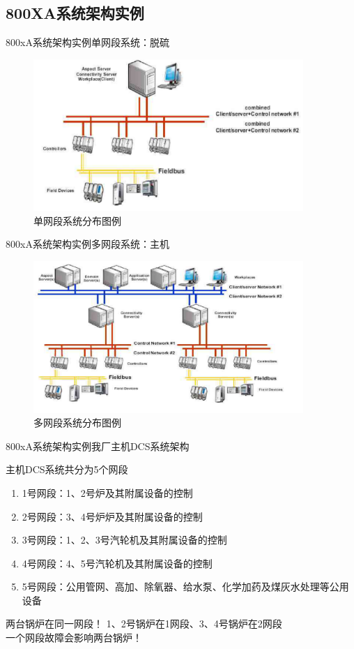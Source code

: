 \documentclass[12pt,hyperref={CJKbookmarks=true}]{beamer} %
\begin{document}
\subsection{800XA系统架构实例}
\begin{frame}{800xA系统架构实例}{单网段系统：脱硫}
		\begin{figure}[htbp]
 \centering
\includegraphics[width=290pt,keepaspectratio]{dan.png}
\caption{单网段系统分布图例}
\label{fig:myphoto}
\end{figure}
	\end{frame}
\begin{frame}{800xA系统架构实例}{多网段系统：主机}
		\begin{figure}[htbp]
 \centering
\includegraphics[width=290pt,keepaspectratio]{da.png}
\caption{多网段系统分布图例}
\label{fig:myphoto}
\end{figure}
	\end{frame}
\begin{frame}{800xA系统架构实例}{我厂主机DCS系统架构}
		\begin{block}{主机DCS系统共分为5个网段}
			\begin{enumerate}
				\item  1号网段：1、2号炉及其附属设备的控制
				
				\item  2号网段：3、4号炉炉及其附属设备的控制
				
				\item   3号网段：1、2、3号汽轮机及其附属设备的控制
				
				\item  4号网段：4、5号汽轮机及其附属设备的控制
\item   5号网段：公用管网、高加、除氧器、给水泵、化学加药及煤灰水处理等公用设备
			\end{enumerate}
		\end{block}
\begin{alertblock}{\heiti 两台锅炉在同一网段！}
			1、2号锅炉在1网段、3、4号锅炉在2网段\\  一个网段故障会影响两台锅炉！
		\end{alertblock}
	\end{frame}
\end{document}
